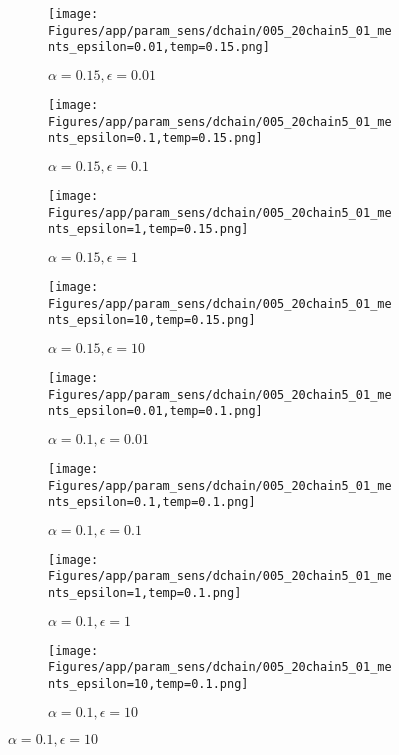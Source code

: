 \documentclass{article}
\theoremstyle{plain}
\begin{document}
\begin{appendices}
\begin{figure}
                \begin{subfigure}[b]{0.24\textwidth}
                    \centering
                    \texttt{[image: Figures/app/param\_sens/dchain/005\_20chain5\_01\_ments\_epsilon=0.01,temp=0.15.png]}
                    \caption*{$\alpha=0.15,\epsilon=0.01$}
                \end{subfigure}
                \begin{subfigure}[b]{0.24\textwidth}
                    \centering
                    \texttt{[image: Figures/app/param\_sens/dchain/005\_20chain5\_01\_ments\_epsilon=0.1,temp=0.15.png]}
                    \caption*{$\alpha=0.15,\epsilon=0.1$}
                \end{subfigure}
                \begin{subfigure}[b]{0.24\textwidth}
                    \centering
                    \texttt{[image: Figures/app/param\_sens/dchain/005\_20chain5\_01\_ments\_epsilon=1,temp=0.15.png]}
                    \caption*{$\alpha=0.15,\epsilon=1$}
                \end{subfigure}
                \begin{subfigure}[b]{0.24\textwidth}
                    \centering
                    \texttt{[image: Figures/app/param\_sens/dchain/005\_20chain5\_01\_ments\_epsilon=10,temp=0.15.png]}
                    \caption*{$\alpha=0.15,\epsilon=10$}
                \end{subfigure}
                
                \begin{subfigure}[b]{0.24\textwidth}
                    \centering
                    \texttt{[image: Figures/app/param\_sens/dchain/005\_20chain5\_01\_ments\_epsilon=0.01,temp=0.1.png]}
                    \caption*{$\alpha=0.1,\epsilon=0.01$}
                \end{subfigure}
                \begin{subfigure}[b]{0.24\textwidth}
                    \centering
                    \texttt{[image: Figures/app/param\_sens/dchain/005\_20chain5\_01\_ments\_epsilon=0.1,temp=0.1.png]}
                    \caption*{$\alpha=0.1,\epsilon=0.1$}
                \end{subfigure}
                \begin{subfigure}[b]{0.24\textwidth}
                    \centering
                    \texttt{[image: Figures/app/param\_sens/dchain/005\_20chain5\_01\_ments\_epsilon=1,temp=0.1.png]}
                    \caption*{$\alpha=0.1,\epsilon=1$}
                \end{subfigure}
                \begin{subfigure}[b]{0.24\textwidth}
                    \centering
                    \texttt{[image: Figures/app/param\_sens/dchain/005\_20chain5\_01\_ments\_epsilon=10,temp=0.1.png]}
                    \caption*{$\alpha=0.1,\epsilon=10$}
                \end{subfigure}
                

\end{figure}
\end{appendices}
\end{document}
